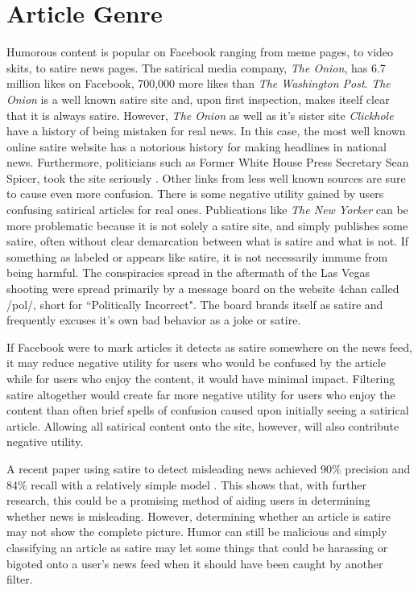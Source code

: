 \documentclass[12pt]{article}
\begin{document}
\section{Article Genre}
Humorous content is popular on Facebook ranging from meme pages, to video skits, to satire news pages. The satirical media company, \textit{The Onion}, has 6.7 million likes on Facebook, 700,000 more likes than \textit{The Washington Post}. \textit{The Onion} is a well known satire site and, upon first inspection, makes itself clear that it is always satire. However, \textit{The Onion} as well as it's sister site \textit{Clickhole} have a history of being mistaken for real news. In this case, the most well known online satire website has a notorious history for making headlines in national news. Furthermore, politicians such as Former White House Press Secretary Sean Spicer, took the site seriously \citep{spicey}. Other links from less well known sources are sure to cause even more confusion. There is some negative utility gained by users confusing satirical articles for real ones. Publications like \textit{The New Yorker} can be more problematic because it is not solely a satire site, and simply publishes some satire, often without clear demarcation between what is satire and what is not. If something as labeled or appears like satire, it is not necessarily immune from being harmful. The conspiracies spread in the aftermath of the Las Vegas shooting were spread primarily by a message board on the website 4chan called /pol/, short for ``Politically Incorrect". The board brands itself as satire and frequently excuses it's own bad behavior as a joke or satire.

If Facebook were to mark articles it detects as satire somewhere on the news feed, it may reduce negative utility for users who would be confused by the article while for users who enjoy the content, it would have minimal impact. Filtering satire altogether would create far more negative utility for users who enjoy the content than often brief spells of confusion caused upon initially seeing a satirical article. Allowing all satirical content onto the site, however, will also contribute negative utility.

A recent paper using satire to detect misleading news achieved 90\% precision and 84\% recall with a relatively simple model \citep{satire_detection}. This shows that, with further research, this could be a promising method of aiding users in determining whether news is misleading. However, determining whether an article is satire may not show the complete picture. Humor can still be malicious and simply classifying an article as satire may let some things that could be harassing or bigoted onto a user's news feed when it should have been caught by another filter.
\end{document}
